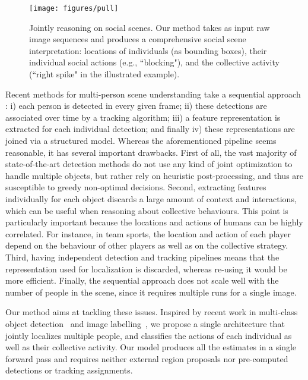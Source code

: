 \documentclass[10pt,twocolumn,letterpaper]{article}
\begin{document}
\begin{figure}[ht!]
\begin{center}
\texttt{[image: figures/pull]}
\end{center}
\caption{Jointly reasoning on social scenes. Our method takes as input raw image
sequences and produces a comprehensive social scene interpretation: locations of
individuals (as bounding boxes), their individual social actions (e.g., ``blocking"), and the collective activity (``right spike" in the illustrated example).}
\label{fi:intro:pull}
\vspace{-0.5cm}
\end{figure}

Recent methods for multi-person scene understanding take a sequential approach
\cite{Ibrahim2016,Deng2016,Ramanathan2016}: i) each person is detected in
every given frame; ii) these detections are associated over time by a
tracking algorithm; iii) a feature representation is extracted for each
individual detection; and finally iv) these representations are joined via
a structured model. Whereas the aforementioned pipeline seems reasonable, it
has several important drawbacks.  
First of all, the vast majority of state-of-the-art detection methods do not use any
kind of joint optimization to handle multiple objects, but rather rely on heuristic post-processing, and thus are susceptible to greedy non-optimal decisions. Second,
extracting features individually for each object discards a large amount of context and
interactions, which can be useful when reasoning about collective behaviours. 
This point is particularly important because the locations and actions of humans can be
highly correlated. 
For instance, in team sports, the location and action of each player depend on the behaviour of other players as well as on the collective strategy.  Third, having
independent detection and tracking pipelines means that the representation used for
localization is discarded, whereas re-using it would be more efficient. Finally, the
sequential approach does not scale well with the number of people in the scene, since it
requires multiple runs for a single image.

Our method aims at tackling these issues. Inspired by recent work in
multi-class object detection~\cite{Ren2015,Redmon2016} and image
labelling~\cite{Johnson2016}, we propose a single architecture that jointly
localizes multiple people, and classifies the actions of each individual as well
as their collective activity. Our model produces all the estimates in a single
forward pass and requires neither external region proposals nor pre-computed 
detections or tracking assignments. 
\end{document}
